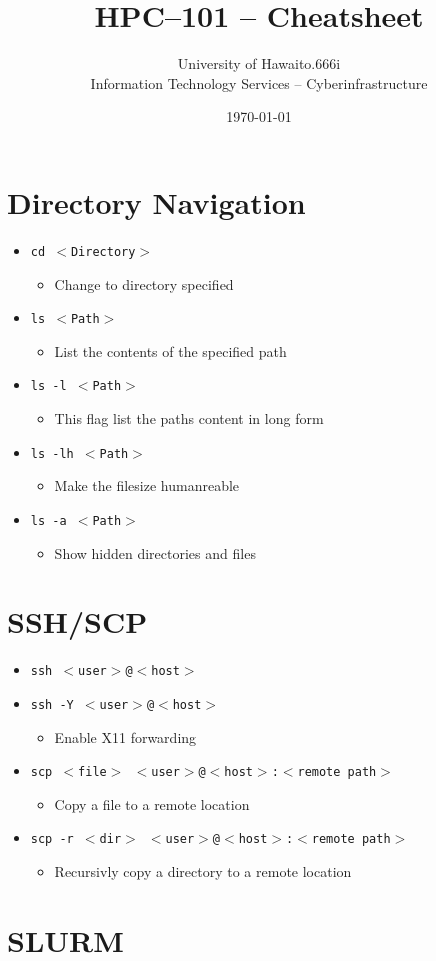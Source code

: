 \documentclass[11pt,twocolumn]{article}
\newcommand{\lft}{$<$}
\newcommand{\rht}{$>$}
\newcommand{\pth}[1]{{\lft}#1{\rht}}
\newlength{\okinalen}
\newcommand{\okina}{\hbox to.666\okinalen{\hss`\hss}}
\newcommand{\hawaii}{Hawai{\okina}i}
\newcommand{\ci}{Cyberinfrastructure}
\newcommand{\desc}[1]{\small \begin{itemize}\item[]#1\end{itemize}}
\begin{document}
\setlength{\droptitle}{-10em}
\title{HPC--101 -- Cheatsheet \vspace{-2ex}}
\date{\today}
\author{University of {\hawaii}\\Information Technology Services -- {\ci}}
\maketitle
\section{Directory Navigation}
\begin{itemize}
\item[] \texttt{cd {\pth{Directory}}}\desc{Change to directory specified}
\item[] \texttt{ls {\pth{Path}}}\desc{List the contents of the specified path}
\item[] \texttt{ls -l {\pth{Path}}}\desc{This flag list the paths content in long form}
\item[] \texttt{ls -lh {\pth{Path}}}\desc{Make the filesize humanreable}
\item[] \texttt{ls -a {\pth{Path}}}\desc{Show hidden directories and files}
\end{itemize}

\section{SSH/SCP}
\begin{itemize}
\item[] \texttt{ssh {\lft}user{\rht}@{\lft}host{\rht}}
\item[] \texttt{ssh -Y {\lft}user{\rht}@{\lft}host{\rht}}\desc{Enable X11 forwarding}
\item[] \texttt{scp~{\lft}file{\rht}~{\lft}user{\rht}@{\lft}host{\rht}:{\lft}remote~path{\rht}}\desc{Copy a file to a remote location}
\item[] \texttt{scp~-r~{\lft}dir{\rht}~{\lft}user{\rht}@{\lft}host{\rht}:{\lft}remote~path{\rht}}\desc{Recursivly copy a directory to a remote location}
\end{itemize}

\section{SLURM}
\end{document}
